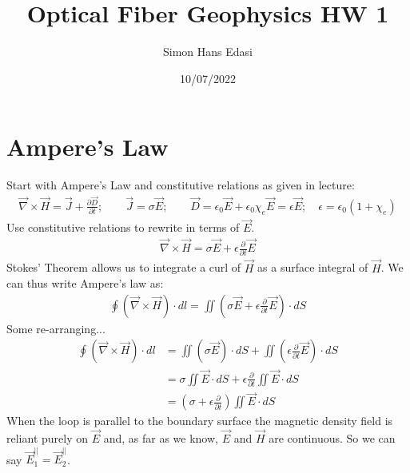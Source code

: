 \documentclass{article}
\title{Optical Fiber Geophysics HW 1}
\date{10/07/2022}
\author{Simon Hans Edasi}
\begin{document}
	\maketitle
	
	
\section{Ampere's Law}
Start with Ampere's Law and constitutive relations as given in lecture:
\begin{align}
\vec{\nabla} \times \vec{H} = \vec{J} + \frac{\partial \vec{D}} {\partial t};
\qquad
\vec{J} = \sigma \vec{E};
\qquad
\vec{D} = \epsilon_{0} \vec{E} + \epsilon_{0} \chi_{e} \vec{E} = \epsilon \vec{E}; \quad \epsilon = \epsilon_{0}(1+\chi_{e})
\end{align}
Use constitutive relations to rewrite in terms of $\vec{E}$.
\begin{align}
\vec{\nabla} \times \vec{H} = \sigma \vec{E} + \epsilon \frac{\partial}{\partial t} \vec{E}
\end{align}
Stokes' Theorem allows us to integrate a curl of $\vec{H}$ as a surface integral of $\vec{H}$. We can thus write Ampere's law as:
\begin{align}
\oint \left( \vec{\nabla} \times \vec{H} \right) \cdot dl = \iint \left( \sigma \vec{E} + \epsilon \frac{\partial}{\partial t} \vec{E} \right) \cdot dS
\end{align}
Some re-arranging...
\begin{align}
\oint \left( \vec{\nabla} \times \vec{H} \right) \cdot dl &= \iint \left( \sigma \vec{E} \right) \cdot dS + \iint \left( \epsilon \frac{\partial}{\partial t} \vec{E} \right) \cdot dS \\
	&= \sigma \iint \vec{E} \cdot dS + \epsilon \frac{\partial}{\partial t} \iint \vec{E}  \cdot dS \\
	&= \left(\sigma + \epsilon \frac{\partial}{\partial t} \right) \iint \vec{E} \cdot dS
\end{align}
When the loop is parallel to the boundary surface the magnetic density field is reliant purely on $\vec{E}$ and, as far as we know, $\vec{E}$ and $\vec{H}$ are continuous. So we can say $\vec{E}_{1}^{||} = \vec{E}_{2}^{||}$.





\clearpage
\end{document}
